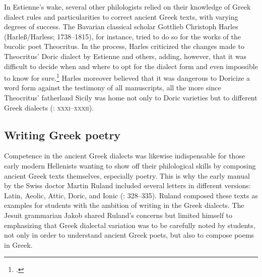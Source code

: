 In Estienne’s wake, several other philologists relied on their knowledge of Greek dialect rules and particularities to correct ancient Greek texts, with varying degrees of success. The Bavarian classical scholar Gottlieb Christoph Harles (Harleß/Harless; 1738–1815), for instance, tried to do so for the works of the bucolic poet Theocritus. In the process, Harles criticized the changes made to Theocritus’ Doric dialect by Estienne and others, adding, however, that it was difficult to decide when and where to opt for the dialect form and even impossible to know for sure.\footnote{\citet[\textsc{xxii–xxiv}]{Harles1780}.} Harles moreover believed that it was dangerous to Doricize a word form against the testimony of all manuscripts, all the more since Theocritus’ fatherland Sicily was home not only to Doric varieties but to different Greek dialects (\citealt{Harles1780}: \textsc{xxxi–xxxii}).

\subsection{Writing Greek poetry}

Competence in the ancient Greek dialects was likewise indispensable for those early modern Hellenists wanting to show off their philological skills by composing ancient Greek texts themselves, especially poetry. This is why the early manual by the Swiss doctor Martin Ruland included several letters in different versions: Latin, Aeolic, Attic, Doric, and Ionic (\citealt{Ruland1556}: 328–335). Ruland composed these texts as examples for students with the ambition of writing in the Greek dialects. The Jesuit grammarian Jakob \citet[35]{Gretser1593} shared Ruland’s concerns but limited himself to emphasizing that Greek dialectal variation was to be carefully noted by students, not only in order to understand ancient Greek poets, but also to compose poems in Greek.

